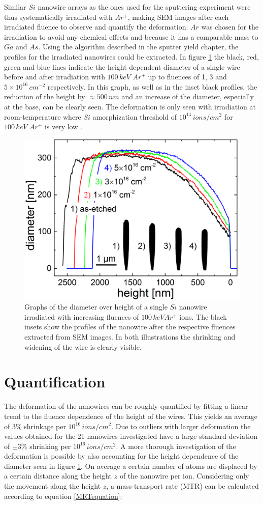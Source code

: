 Similar $Si$ nanowire arrays as the ones used for the sputtering experiment were thus systematically irradiated with $Ar^+$, making SEM images after each irradiated fluence to observe and quantify the deformation. $Ar$ was chosen for the irradiation to avoid any chemical effects and because it has a comparable mass to $Ga$ and $As$. Using the algorithm described in the sputter yield chapter, the profiles for the irradiated nanowires could be extracted. In figure \ref{deformationprofile} the black, red, green and blue lines indicate the height dependent diameter of a single wire before and after irradiation with $100\,keV\,\,Ar^+$ up to fluences of 1, 3 and $5 \times 10^{16}\,cm^{-2}$ respectively. In this graph, as well as in the inset black profiles, the reduction of the height by $\approx 500\,nm$ and an increase of the diameter, especially at the base, can be clearly seen. The deformation is only seen with irradiation at room-temperature where $Si$ amorphization threshold of $10^{14}\,ions/cm^2$ for $100\,keV\,\,Ar^+$ is very low \cite{pelaz_ion-beam-induced_2004}.

\begin{figure}
	\centering
		\includegraphics[width=.48\textwidth]{images/deformationprofile.jpg}
	\caption{Graphs of the diameter over height of a single $Si$ nanowire irradiated with increasing fluences of $100\,keV Ar^+$ ions. The black insets show the profiles of the nanowire after the respective fluences extracted from SEM images. In both illustrations the shrinking and widening of the wire is clearly visible.} 
	\label{deformationprofile}
\end{figure}

\section{Quantification}

The deformation of the nanowires can be roughly quantified by fitting a linear trend to the fluence dependence of the height of the wires. This yields an average of $3\%$ shrinkage per $10^{16}\,ions/cm^2$. Due to outliers with larger deformation the values obtained for the 21 nanowires investigated have a large standard deviation of $\pm 3\%$ shrinking per $10^{16}\,ions/cm^2$. A more thorough investigation of the deformation is possible by also accounting for the height dependence of the diameter seen in figure \ref{deformationprofile}. On average a certain number of atoms are displaced by a certain distance along the height $z$ of the nanowire per ion. Considering only the movement along the height $z$, a mass-transport rate (MTR) can be calculated according to equation \ref{MRTequation}:

